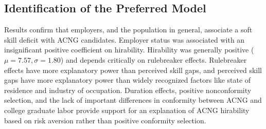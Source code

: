 \documentclass[review]{elsarticle}
\begin{document}



\subsection{Identification of the Preferred Model}

Results confirm that employers, and the population in general, associate a soft skill deficit with ACNG candidates.
Employer status was associated with an insignificant positive coefficient on hirability.
Hirability was generally positive ($\mu = 7.57, \sigma = 1.80$) and depends critically on rulebreaker effects.
Rulebreaker effects have more explanatory power than perceived skill gaps,
and perceived skill gaps have more explanatory power than widely recognized factors like state of residence and industry of occupation.
Duration effects, positive nonconformity selection,
and the lack of important differences in conformity between ACNG and college graduate labor
provide support for an explanation of ACNG hirability based on risk aversion rather than positive conformity selection.
\end{document}
